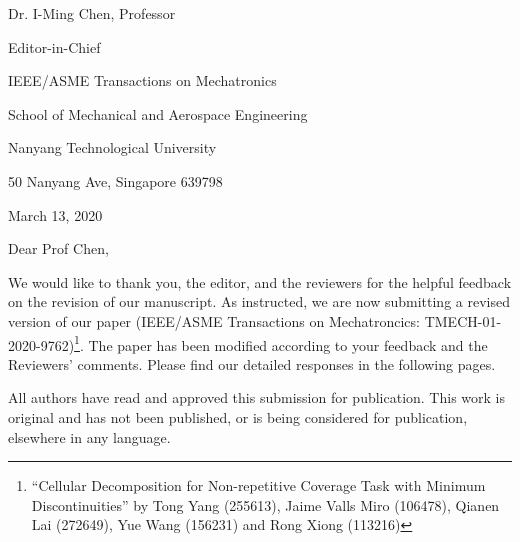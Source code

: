 \documentclass[11pt]{article}
\author{Jaime Jaime Valls Miro \and Tong Yang}
\begin{document}


\setlength{\parindent}{0pt}
\hspace*{0.5\linewidth}
\begin{minipage}{0.7\linewidth}
Dr. I-Ming Chen, Professor \par 
Editor-in-Chief \par 
IEEE/ASME Transactions on Mechatronics \par 
School of Mechanical and Aerospace Engineering \par
Nanyang Technological University \par
50 Nanyang Ave, Singapore 639798 \par \bigskip
March 13, 2020 %
\end{minipage}

\vspace{2cm}


Dear Prof Chen, \par \bigskip

We would like to thank you, the editor, and the reviewers for the helpful feedback on the revision of our manuscript. As instructed, we are now submitting a revised version of our paper (IEEE/ASME Transactions on Mechatroncics: TMECH-01-2020-9762)\footnote{``Cellular Decomposition for Non-repetitive Coverage Task with Minimum Discontinuities'' by Tong Yang (255613), Jaime Valls Miro (106478), Qianen Lai (272649), Yue Wang (156231) and Rong Xiong (113216)}. The paper has been modified according to your feedback and the Reviewers' comments. Please find our detailed responses in the following pages. %

\par \bigskip All authors have read and approved this submission for publication. This work is original and has not been published, or is being considered for publication, elsewhere in any language. 
\end{document}
